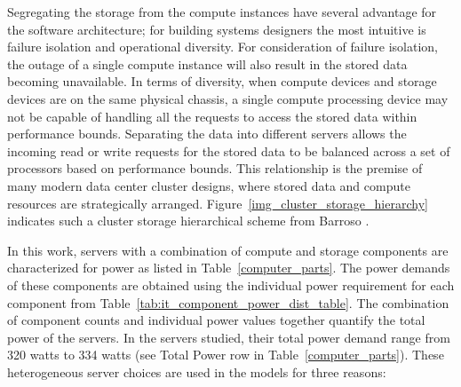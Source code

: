             Segregating the storage from the compute instances have several advantage for the software architecture; for building systems designers the most intuitive is failure isolation and operational diversity. For consideration of failure isolation, the outage of a single compute instance will also result in the stored data becoming unavailable. In terms of diversity, when compute devices and storage devices are on the same physical chassis, a single compute processing device may not be capable of handling all the requests to access the stored data within performance bounds. Separating the data into different servers allows the incoming read or write requests for the stored data to be balanced across a set of processors based on performance bounds. This relationship is the premise of many modern data center cluster designs, where stored data and compute resources are strategically arranged. Figure~\ref{img_cluster_storage_hierarchy} indicates such a cluster storage hierarchical scheme from Barroso \cite{barroso18}. 
            
            
            
            In this work, servers with a combination of compute and storage components are characterized for power as listed in Table~\ref{computer_parts}. The power demands of these components are obtained using the individual power requirement for each component from Table~\ref{tab:it_component_power_dist_table}. The combination of component counts and individual power values together quantify the total power of the servers. In the servers studied, their total power demand range from 320 watts to 334 watts (see Total Power row in Table~\ref{computer_parts}). These heterogeneous server choices are used in the models for three reasons:
            
             
            
